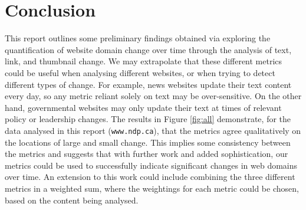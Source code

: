 \documentclass[10pt, a4paper]{article}
\begin{document}
\section{Conclusion}
\vspace{-2mm}
This report outlines some preliminary findings obtained via exploring the quantification of website domain change over time through the analysis of text, link, and thumbnail change. We may extrapolate that these different metrics could be useful when analysing different websites, or when trying to detect different types of change. For example, news websites update their text content every day, so any metric reliant solely on text may be over-sensitive. On the other hand, governmental websites may only update their text at times of relevant policy or leadership changes. The results in Figure \ref{fig:all} demonstrate, for the data analysed in this report (\texttt{www.ndp.ca}), that the metrics agree qualitatively on the locations of large and small change. This implies some consistency between the metrics and suggests that with further work and added sophistication, our metrics could be used to successfully indicate significant changes in web domains over time. An extension to this work could include combining the three different metrics in a weighted sum, where the weightings for each metric could be chosen, based on the content being analysed.



\end{document}
